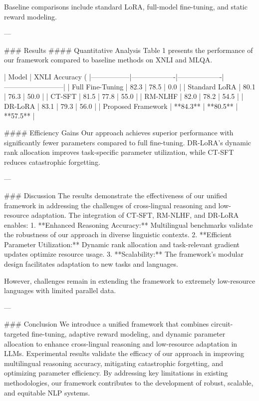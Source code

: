 Baseline comparisons include standard LoRA, full-model fine-tuning, and static reward modeling.

---

### Results
#### Quantitative Analysis
Table 1 presents the performance of our framework compared to baseline methods on XNLI and MLQA.

| Model          | XNLI Accuracy (%
|-----------------|-------------------|-------------------|--------------------------|
| Full Fine-Tuning | 82.3             | 78.5             | 0.0                      |
| Standard LoRA   | 80.1             | 76.3             | 50.0                     |
| CT-SFT          | 81.5             | 77.8             | 55.0                     |
| RM-NLHF         | 82.0             | 78.2             | 54.5                     |
| DR-LoRA         | 83.1             | 79.3             | 56.0                     |
| Proposed Framework | **84.3**       | **80.5**         | **57.5**                 |

#### Efficiency Gains
Our approach achieves superior performance with significantly fewer parameters compared to full fine-tuning. DR-LoRA's dynamic rank allocation improves task-specific parameter utilization, while CT-SFT reduces catastrophic forgetting.

---

### Discussion
The results demonstrate the effectiveness of our unified framework in addressing the challenges of cross-lingual reasoning and low-resource adaptation. The integration of CT-SFT, RM-NLHF, and DR-LoRA enables:
1. **Enhanced Reasoning Accuracy:** Multilingual benchmarks validate the robustness of our approach in diverse linguistic contexts.
2. **Efficient Parameter Utilization:** Dynamic rank allocation and task-relevant gradient updates optimize resource usage.
3. **Scalability:** The framework's modular design facilitates adaptation to new tasks and languages.

However, challenges remain in extending the framework to extremely low-resource languages with limited parallel data.

---

### Conclusion
We introduce a unified framework that combines circuit-targeted fine-tuning, adaptive reward modeling, and dynamic parameter allocation to enhance cross-lingual reasoning and low-resource adaptation in LLMs. Experimental results validate the efficacy of our approach in improving multilingual reasoning accuracy, mitigating catastrophic forgetting, and optimizing parameter efficiency. By addressing key limitations in existing methodologies, our framework contributes to the development of robust, scalable, and equitable NLP systems.

